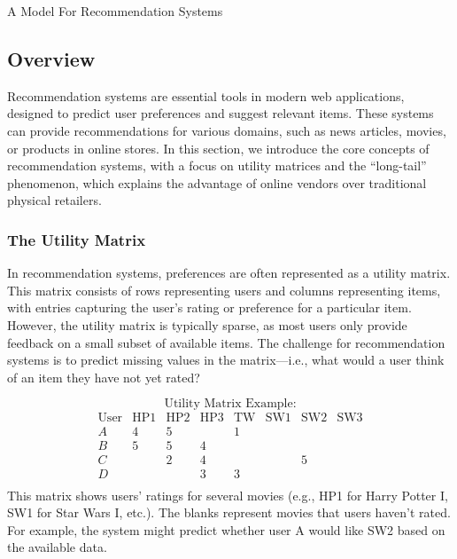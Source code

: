 \begin{notes}{A Model For Recommendation Systems}
    \subsection*{Overview}

    Recommendation systems are essential tools in modern web applications, designed to predict user preferences and suggest relevant items. These systems can provide recommendations for various domains, 
    such as news articles, movies, or products in online stores. In this section, we introduce the core concepts of recommendation systems, with a focus on utility matrices and the “long-tail” phenomenon, 
    which explains the advantage of online vendors over traditional physical retailers.
    
    \subsubsection*{The Utility Matrix}
    
    In recommendation systems, preferences are often represented as a utility matrix. This matrix consists of rows representing users and columns representing items, with entries capturing the user's rating or 
    preference for a particular item. However, the utility matrix is typically sparse, as most users only provide feedback on a small subset of available items. The challenge for recommendation systems is to predict 
    missing values in the matrix—i.e., what would a user think of an item they have not yet rated?
    
    \[
    \text{Utility Matrix Example:}
    \]
    \[
    \begin{array}{c|ccccccc}
        \text{User} & \text{HP1} & \text{HP2} & \text{HP3} & \text{TW} & \text{SW1} & \text{SW2} & \text{SW3} \\
        \hline
        A & 4 & 5 & & 1 & & & \\
        B & 5 & 5 & 4 & & & & \\
        C & & 2 & 4 & & & 5 & \\
        D & & & 3 & 3 & & & \\
    \end{array}
    \]
    This matrix shows users' ratings for several movies (e.g., HP1 for Harry Potter I, SW1 for Star Wars I, etc.). The blanks represent movies that users haven't rated. For example, the system might predict whether 
    user A would like SW2 based on the available data.
    

\end{notes}
